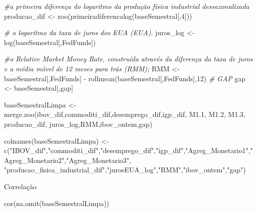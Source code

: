 \documentclass[
]{article}
\newenvironment{Shaded}{\begin{snugshade}}{\end{snugshade}}
\newcommand{\CommentTok}[1]{\textcolor[rgb]{0.56,0.35,0.01}{\textit{#1}}}
\newcommand{\DecValTok}[1]{\textcolor[rgb]{0.00,0.00,0.81}{#1}}
\newcommand{\FloatTok}[1]{\textcolor[rgb]{0.00,0.00,0.81}{#1}}
\newcommand{\FunctionTok}[1]{\textcolor[rgb]{0.00,0.00,0.00}{#1}}
\newcommand{\NormalTok}[1]{#1}
\newcommand{\OtherTok}[1]{\textcolor[rgb]{0.56,0.35,0.01}{#1}}
\newcommand{\SpecialCharTok}[1]{\textcolor[rgb]{0.00,0.00,0.00}{#1}}
\newcommand{\StringTok}[1]{\textcolor[rgb]{0.31,0.60,0.02}{#1}}
\begin{document}
\begin{Shaded}
\begin{Highlighting}[]
\CommentTok{\#a primeira diferença do logaritmo da produção física industrial dessazonalizada}
\NormalTok{producao\_dif }\OtherTok{\textless{}{-}} \FunctionTok{zoo}\NormalTok{(}\FunctionTok{primeiradiferencalog}\NormalTok{(baseSemestral[,}\DecValTok{4}\NormalTok{]))}

\CommentTok{\# o logaritmo da taxa de juros dos EUA (EUA).}
\NormalTok{juros\_log }\OtherTok{\textless{}{-}} \FunctionTok{log}\NormalTok{(baseSemestral[,}\StringTok{\textquotesingle{}FedFunds\textquotesingle{}}\NormalTok{])}

\CommentTok{\#o Relative Market Money Rate, construída através da diferença da taxa de juros e a média móvel de 12 meses para trás (RMM);}
\NormalTok{RMM }\OtherTok{\textless{}{-}}\NormalTok{ baseSemestral[,}\StringTok{\textquotesingle{}FedFunds\textquotesingle{}}\NormalTok{] }\SpecialCharTok{{-}} \FunctionTok{rollmean}\NormalTok{(baseSemestral[,}\StringTok{\textquotesingle{}FedFunds\textquotesingle{}}\NormalTok{],}\DecValTok{12}\NormalTok{)}
\CommentTok{\# GAP}
\NormalTok{gap }\OtherTok{\textless{}{-}}\NormalTok{ baseSemestral[,}\StringTok{\textquotesingle{}gap\textquotesingle{}}\NormalTok{]}

\NormalTok{baseSemestralLimpa }\OtherTok{\textless{}{-}} \FunctionTok{merge.zoo}\NormalTok{(ibov\_dif,commoditi\_dif,desemprego\_dif,igp\_dif, M1}\FloatTok{.1}\NormalTok{, M1}\FloatTok{.2}\NormalTok{, M1}\FloatTok{.3}\NormalTok{, producao\_dif, juros\_log,RMM,ibov\_ontem,gap)}

\FunctionTok{colnames}\NormalTok{(baseSemestralLimpa) }\OtherTok{\textless{}{-}} \FunctionTok{c}\NormalTok{(}\StringTok{"IBOV\_dif"}\NormalTok{,}\StringTok{"commoditi\_dif"}\NormalTok{,}\StringTok{"desemprego\_dif"}\NormalTok{,}\StringTok{"igp\_dif"}\NormalTok{,}\StringTok{"Agreg\_Monetario1"}\NormalTok{,}\StringTok{"Agreg\_Monetario2"}\NormalTok{,}\StringTok{"Agreg\_Monetario3"}\NormalTok{,}
                         \StringTok{"producao\_fisica\_industrial\_dif"}\NormalTok{,}\StringTok{"jurosEUA\_log"}\NormalTok{,}\StringTok{"RMM"}\NormalTok{,}\StringTok{"ibov\_ontem"}\NormalTok{,}\StringTok{"gap"}\NormalTok{)}
\end{Highlighting}
\end{Shaded}

Correlação

\begin{Shaded}
\begin{Highlighting}[]
\FunctionTok{cor}\NormalTok{(}\FunctionTok{na.omit}\NormalTok{(baseSemestralLimpa))}
\end{Highlighting}
\end{Shaded}
\end{document}

